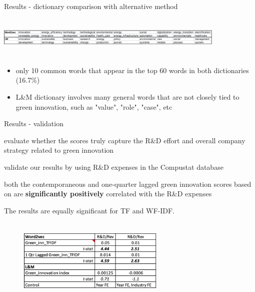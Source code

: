 \documentclass[cjk,usenames,dvipsnames]{beamer}
\begin{document}
\begin{frame}{Results - dictionary comparison with alternative method}

  \includegraphics[height=2cm, width=11cm]{dict.png}

  \begin{itemize}
    \item only 10 common words that appear in the top 60 words in both dictionaries (16.7\%) 
    \item L\&M dictionary involves many general words that are not closely tied to green innovation, such as
"value", "role", "case", etc
         \end{itemize}
\end{frame}


\begin{frame}{Results - validation}

  \begin{itemize}
  \begin{scriptsize}
    \item evaluate whether the scores truly capture the R&D effort and overall company strategy related to green
innovation 
    \item validate our results by using R\&D expenses in the Compustat database
    \item both the contemporaneous and one-quarter lagged green innovation scores based on are \textbf{significantly positively} correlated with the R\&D expenses
    \item The results are equally significant for TF and WF-IDF.
    \end{scriptsize}
         \end{itemize}
\begin{figure}
	\centering
  \includegraphics[height=4cm, width=7cm]{validation.png}
\end{figure}         
\end{frame}
\end{document}
